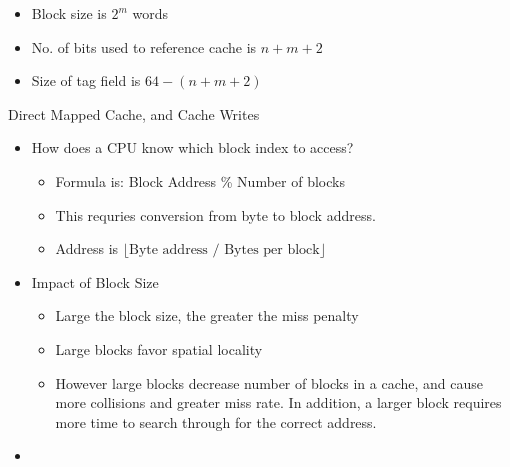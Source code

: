 \documentclass{report}
\begin{document}
\begin{description}
\begin{itemize}
            \item Block size is $2^m$ words
            \item No. of bits used to reference cache is
                $n + m + 2$
            \item Size of tag field is $64 - (n + m + 2)$
        \end{itemize}
    \item {\large Direct Mapped Cache, and Cache Writes}
        \begin{itemize}
            \item How does a CPU know which block index to access?
                \begin{itemize}
                    \item Formula is: Block Address \% Number of blocks
                    \item This requries conversion from byte to block address.
                    \item Address is $\lfloor \textrm{Byte address / Bytes per block}\rfloor$ 
                \end{itemize}
            \item Impact of Block Size
                \begin{itemize}
                    \item Large the block size, the greater the
                        miss penalty
                    \item Large blocks favor spatial locality
                    \item However large blocks decrease number
                        of blocks in a cache, and cause more
                        collisions and greater miss rate.
                        In addition, a larger block requires more
                        time to search through for the correct
                        address.
                \end{itemize}
                \pagebreak
            \item  
        \end{itemize}
\end{description}
\end{document}
